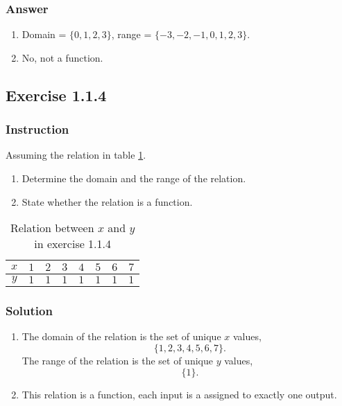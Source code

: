 \documentclass[11pt, letterpaper, oneside]{memoir}
\begin{document}
\subsubsection{Answer}

\begin{enumerate}[label=(\alph*)]
  \item Domain = $ \{ 0, 1, 2, 3 \} $, range = $ \{ -3, -2, -1, 0, 1, 2, 3 \} $.
  \item No, not a function.
\end{enumerate}

\subsection*{Exercise 1.1.4}

\subsubsection{Instruction}

Assuming the relation in table \ref{table:exercise-1.1.4}.
\begin{enumerate}[label=(\alph*)]
  \item Determine the domain and the range of the relation.
  \item State whether the relation is a function.
\end{enumerate}

\begin{table}[ht]
  \centering
  \begin{tabular}{ c | r r r r r r r }
    \hline
    $ x $ & $ 1 $ & $ 2 $ & $ 3 $ & $ 4 $ & $ 5 $ & $ 6 $ & $ 7 $ \\
    \hline
    $ y $ & $ 1 $ & $ 1 $ & $ 1 $ & $ 1 $ & $ 1 $ & $ 1 $ & $ 1 $ \\
    \hline
  \end{tabular}
  \caption{Relation between $ x $ and $ y $ in exercise 1.1.4}
  \label{table:exercise-1.1.4}
\end{table}

\subsubsection{Solution}

\begin{enumerate}[label=(\alph*)]
  \item The domain of the relation is the set of unique $ x $ values,
    $$ \phantom{.}
    \{ 1, 2, 3, 4, 5, 6, 7 \}
    .$$
    The range of the relation is the set of unique $ y $ values,
    $$ \phantom{.}
    \{ 1 \}
    .$$
  \item This relation is a function, each input is a assigned to exactly one output.
\end{enumerate}
\end{document}
